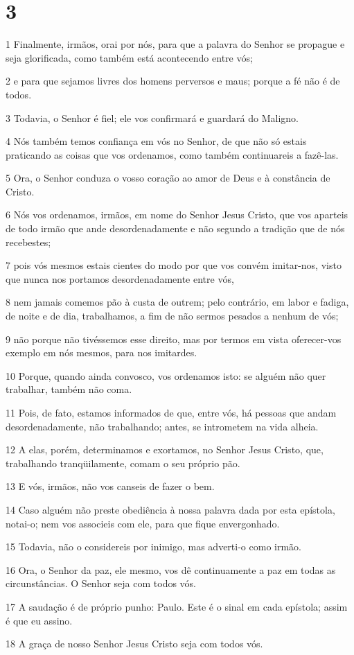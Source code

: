 \chapter{3}

\par 1 Finalmente, irmãos, orai por nós, para que a palavra do Senhor se propague e seja glorificada, como também está acontecendo entre vós;
\par 2 e para que sejamos livres dos homens perversos e maus; porque a fé não é de todos.
\par 3 Todavia, o Senhor é fiel; ele vos confirmará e guardará do Maligno.
\par 4 Nós também temos confiança em vós no Senhor, de que não só estais praticando as coisas que vos ordenamos, como também continuareis a fazê-las.
\par 5 Ora, o Senhor conduza o vosso coração ao amor de Deus e à constância de Cristo.
\par 6 Nós vos ordenamos, irmãos, em nome do Senhor Jesus Cristo, que vos aparteis de todo irmão que ande desordenadamente e não segundo a tradição que de nós recebestes;
\par 7 pois vós mesmos estais cientes do modo por que vos convém imitar-nos, visto que nunca nos portamos desordenadamente entre vós,
\par 8 nem jamais comemos pão à custa de outrem; pelo contrário, em labor e fadiga, de noite e de dia, trabalhamos, a fim de não sermos pesados a nenhum de vós;
\par 9 não porque não tivéssemos esse direito, mas por termos em vista oferecer-vos exemplo em nós mesmos, para nos imitardes.
\par 10 Porque, quando ainda convosco, vos ordenamos isto: se alguém não quer trabalhar, também não coma.
\par 11 Pois, de fato, estamos informados de que, entre vós, há pessoas que andam desordenadamente, não trabalhando; antes, se intrometem na vida alheia.
\par 12 A elas, porém, determinamos e exortamos, no Senhor Jesus Cristo, que, trabalhando tranqüilamente, comam o seu próprio pão.
\par 13 E vós, irmãos, não vos canseis de fazer o bem.
\par 14 Caso alguém não preste obediência à nossa palavra dada por esta epístola, notai-o; nem vos associeis com ele, para que fique envergonhado.
\par 15 Todavia, não o considereis por inimigo, mas adverti-o como irmão.
\par 16 Ora, o Senhor da paz, ele mesmo, vos dê continuamente a paz em todas as circunstâncias. O Senhor seja com todos vós.
\par 17 A saudação é de próprio punho: Paulo. Este é o sinal em cada epístola; assim é que eu assino.
\par 18 A graça de nosso Senhor Jesus Cristo seja com todos vós.



